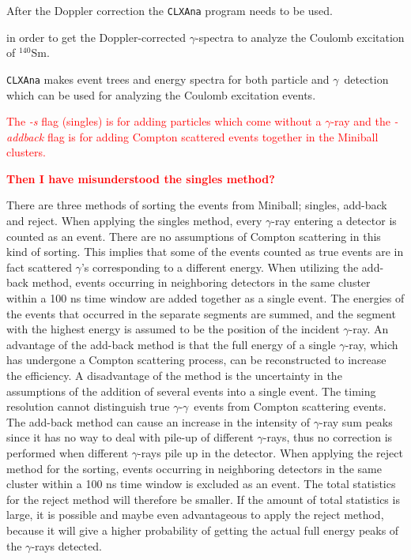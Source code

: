\documentclass[twoside,english]{uiofysmaster/uiofysmaster}
\newcommand{\Sm}{$^{140}$Sm} %
\newcommand{\ga}{$\gamma$}
\begin{document}
After the Doppler correction the \texttt{CLXAna} program needs to be used.


 in order to get the Doppler-corrected \ga-spectra to analyze the Coulomb excitation of \Sm.

\texttt{CLXAna} makes event trees and energy spectra for both particle and \ga\ detection which can be used for analyzing the Coulomb excitation events.


\bigskip


\textcolor{red}{The \textit{-s} flag (singles) is for adding particles which come without a \ga-ray and the \textit{-addback} flag is for adding Compton scattered events together in the Miniball clusters.}

\textcolor{red}{\textbf{Then I have misunderstood the singles method?}}

There are three methods of sorting the events from Miniball; singles, add-back and reject. 
When applying the singles method, every \ga-ray entering a detector is counted as an event.
There are no assumptions of Compton scattering in this kind of sorting. 
This implies that some of the events counted as true events are in fact scattered \ga's corresponding to a different energy.
When utilizing the add-back method, events occurring in neighboring detectors in the same cluster within a 100 ns time window are added together as a single event. 
The energies of the events that occurred in the separate segments are summed, and the segment with the highest energy is assumed to be the position of the incident \ga-ray.
An advantage of the add-back method is that the full energy of a single \ga-ray, which has undergone a Compton scattering process, can be reconstructed to increase the efficiency.
A disadvantage of the method is the uncertainty in the assumptions of the addition of several events into a single event. 
The timing resolution cannot distinguish true \ga-\ga\ events from Compton scattering events.
The add-back method can cause an increase in the intensity of \ga-ray sum peaks since it has no way to deal with pile-up of different \ga-rays, thus no correction is performed when different \ga-rays pile up in the detector.
When applying the reject method for the sorting, events occurring in neighboring detectors in the same cluster within a 100 ns time window is excluded as an event. 
The total statistics for the reject method will therefore be smaller. 
If the amount of total statistics is large, it is possible and maybe even advantageous to apply the reject method, because it will give a higher probability of getting the actual full energy peaks of the \ga-rays detected. 
\end{document}
